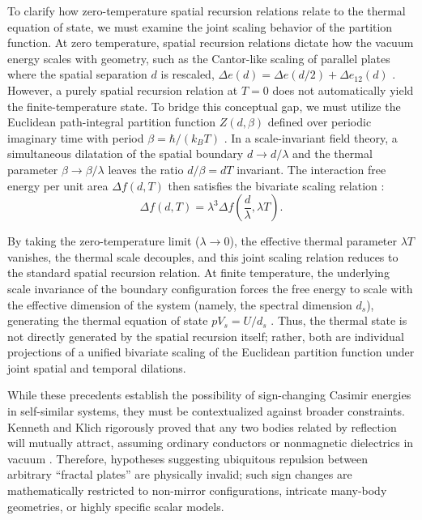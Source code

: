 \documentclass[12pt,letterpaper]{article}
\newcommand{\revision}[1]{#1}
\begin{document}
\revision{To clarify how zero-temperature spatial recursion relations relate to the thermal equation of state, we must examine the joint scaling behavior of the partition function. At zero temperature, spatial recursion relations dictate how the vacuum energy scales with geometry, such as the Cantor-like scaling of parallel plates where the spatial separation $d$ is rescaled, $\Delta e(d) = \Delta e(d/2) + \Delta e_{12}(d)$ \cite{shajesh2016}. However, a purely spatial recursion relation at $T=0$ does not automatically yield the finite-temperature state. To bridge this conceptual gap, we must utilize the Euclidean path-integral partition function $Z(d, \beta)$ defined over periodic imaginary time with period $\beta = \hbar / (k_B T)$ \cite{bordag2009}. In a scale-invariant field theory, a simultaneous dilatation of the spatial boundary $d \to d/\lambda$ and the thermal parameter $\beta \to \beta/\lambda$ leaves the ratio $d/\beta = d T$ invariant. The interaction free energy per unit area $\Delta f(d, T)$ then satisfies the bivariate scaling relation \cite{bordag2009}:
\begin{equation}
\Delta f(d, T) = \lambda^3 \Delta f\left(\frac{d}{\lambda}, \lambda T\right).
\label{eq:bivariate_scaling}
\end{equation}

By taking the zero-temperature limit ($\lambda \to 0$), the effective thermal parameter $\lambda T$ vanishes, the thermal scale decouples, and this joint scaling relation reduces to the standard spatial recursion relation. At finite temperature, the underlying scale invariance of the boundary configuration forces the free energy to scale with the effective dimension of the system (namely, the spectral dimension $d_s$), generating the thermal equation of state $p V_s = U / d_s$ \cite{akkermans2010}. Thus, the thermal state is not directly generated by the spatial recursion itself; rather, both are individual projections of a unified bivariate scaling of the Euclidean partition function under joint spatial and temporal dilations.}

While these precedents establish the possibility of sign-changing Casimir energies in self-similar systems, they must be contextualized against broader constraints.
Kenneth and Klich rigorously proved that any two bodies related by reflection will mutually attract, assuming ordinary conductors or nonmagnetic dielectrics in vacuum \cite{kennethklich2006}.
Therefore, hypotheses suggesting ubiquitous repulsion between arbitrary ``fractal plates'' are physically invalid;
such sign changes are mathematically restricted to non-mirror configurations, intricate many-body geometries, or highly specific scalar models.
\end{document}
